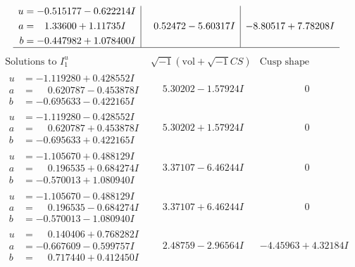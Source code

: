 \documentclass[1p]{elsarticle_modified}
\theoremstyle{definition}
\newcommand{\I}{\sqrt{-1}}
\begin{document}
$$\begin{array}{c|c|c}
\begin{aligned}
u &= -0.515177 - 0.622214 I \\
a &= \phantom{-}1.33600 + 1.11735 I \\
b &= -0.447982 + 1.078400 I\end{aligned}
 & \phantom{-}0.52472 - 5.60317 I & -8.80517 + 7.78208 I\\
 \hline 
 \end{array}$$\newpage$$\begin{array}{c|c|c}  
\text{Solutions to }I^u_{1}& \I (\text{vol} + \sqrt{-1}CS) & \text{Cusp shape}\\
 \hline 
\begin{aligned}
u &= -1.119280 + 0.428552 I \\
a &= \phantom{-}0.620787 - 0.453878 I \\
b &= -0.695633 - 0.422165 I\end{aligned}
 & \phantom{-}5.30202 - 1.57924 I & \phantom{-0.000000 } 0 \\ \hline\begin{aligned}
u &= -1.119280 - 0.428552 I \\
a &= \phantom{-}0.620787 + 0.453878 I \\
b &= -0.695633 + 0.422165 I\end{aligned}
 & \phantom{-}5.30202 + 1.57924 I & \phantom{-0.000000 } 0 \\ \hline\begin{aligned}
u &= -1.105670 + 0.488129 I \\
a &= \phantom{-}0.196535 + 0.684274 I \\
b &= -0.570013 + 1.080940 I\end{aligned}
 & \phantom{-}3.37107 - 6.46244 I & \phantom{-0.000000 } 0 \\ \hline\begin{aligned}
u &= -1.105670 - 0.488129 I \\
a &= \phantom{-}0.196535 - 0.684274 I \\
b &= -0.570013 - 1.080940 I\end{aligned}
 & \phantom{-}3.37107 + 6.46244 I & \phantom{-0.000000 } 0 \\ \hline\begin{aligned}
u &= \phantom{-}0.140406 + 0.768282 I \\
a &= -0.667609 - 0.599757 I \\
b &= \phantom{-}0.717440 + 0.412450 I\end{aligned}
 & \phantom{-}2.48759 - 2.96564 I & -4.45963 + 4.32184 I \\ \hline\begin{aligned}

\end{aligned}
\end{array}$$
\end{document}
